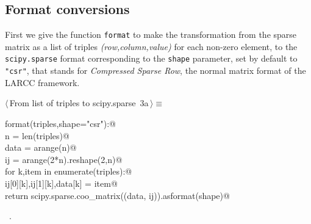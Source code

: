 \documentclass[11pt,oneside]{article}	%
\begin{document}
\subsection{Format conversions}

First we give the function \texttt{format} to make the transformation from the sparse matrix as a list of triples \emph{(row,column,value)} for each non-zero element, to the \texttt{scipy.sparse} format corresponding to the \texttt{shape} parameter, set by default to \texttt{"csr"}, that stands for \emph{Compressed Sparse Row}, the normal matrix format of the LARCC framework. 
\begin{flushleft} \small
\begin{minipage}{\linewidth} \label{scrap1}
\protect{}$\langle\,$From list of triples to scipy.sparse\nobreak\ {\footnotesize 3a}$\,\rangle\equiv$
\vspace{-1ex}
\begin{list}{}{} \item
\mbox{}\verb@def format(triples,shape="csr"):@\\
\mbox{}\verb@    n = len(triples)@\\
\mbox{}\verb@    data = arange(n)@\\
\mbox{}\verb@    ij = arange(2*n).reshape(2,n)@\\
\mbox{}\verb@    for k,item in enumerate(triples):@\\
\mbox{}\verb@        ij[0][k],ij[1][k],data[k] = item@\\
\mbox{}\verb@    return scipy.sparse.coo_matrix((data, ij)).asformat(shape)@\\
\mbox{}\verb@@{\NWsep}
\end{list}
\vspace{-1ex}
\footnotesize\addtolength{\baselineskip}{-1ex}
\begin{list}{}{\setlength{\itemsep}{-\parsep}\setlength{\itemindent}{-\leftmargin}}
\item \NWtxtMacroRefIn\ .
\end{list}
\end{minipage}\\[4ex]
\end{flushleft}
\end{document}
